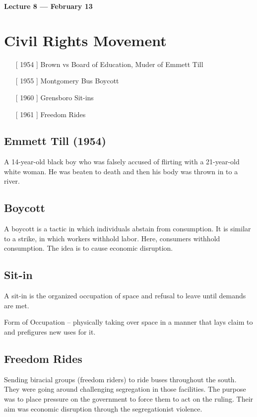 \vspace{3mm}
\noindent \textbf{Lecture 8 --- February 13\th}


\section{Civil Rights Movement}

\begin{itemize}
    \item[[ 1954]] Brown vs Board of Education, Muder of Emmett Till
    
    \item[[ 1955]] Montgomery Bus Boycott

   \item[[ 1960]] Grensboro Sit-ins
   \item [[ 1961]] Freedom Rides
\end{itemize}


\subsection{Emmett Till (1954)}
A 14-year-old black boy who was falsely accused of flirting with a 21-year-old white woman.
He was beaten to death and then his body was thrown in to a river.

\subsection{Boycott}
A boycott is a tactic in which individuals abstain from consumption.
It is similar to a strike, in which workers withhold labor.
Here, consumers withhold consumption.
The idea is to cause economic disruption.

\subsection{Sit-in}
A sit-in is the organized occupation of space and refusal to leave until demands are met.

Form of Occupation -- physically taking over space in a manner that lays claim to and prefigures new uses for it.

\subsection{Freedom Rides}
Sending biracial groups (freedom riders) to ride buses throughout the south.
They were going around challenging segregation in those facilities.
The purpose was to place pressure on the government to force them to act on the ruling.
Their aim was economic disruption through the segregationist violence.



